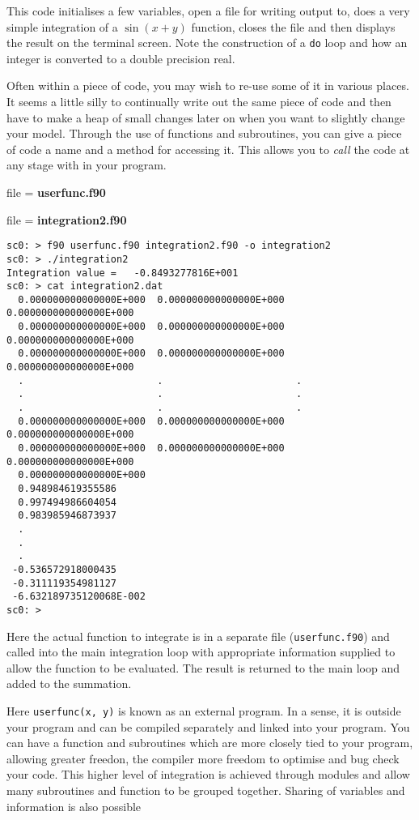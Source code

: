 \documentclass[12pt,a4paper,oneside,openany]{report}
\newcommand{\fcode}[1]{\par file = \textbf{#1} }
\newcommand{\code}[1]{\texttt{#1}}
\begin{document}
This code initialises a few variables, open a file for writing output to, does a very simple integration of a $\sin(x+y)$ function, closes the file and then displays the result on the terminal screen.  Note the construction of a \code{do} loop and how an integer is converted to a double precision real.

Often within a piece of code, you may wish to re-use some of it in various places.  It seems a little silly to continually write out the same piece of code and then have to make a heap of small changes later on when you want to slightly change your model.  Through the use of functions and subroutines, you can give a piece of code a name and a method for accessing it.  This allows you to \textit{call} the code at any stage with in your program.
\fcode{userfunc.f90}

\newpage

\fcode{integration2.f90}

\newpage

\begin{verbatim}
sc0: > f90 userfunc.f90 integration2.f90 -o integration2
sc0: > ./integration2
Integration value =   -0.8493277816E+001
sc0: > cat integration2.dat
  0.000000000000000E+000  0.000000000000000E+000  0.000000000000000E+000
  0.000000000000000E+000  0.000000000000000E+000  0.000000000000000E+000
  0.000000000000000E+000  0.000000000000000E+000  0.000000000000000E+000
  .                       .                       .
  .                       .                       .
  .                       .                       .
  0.000000000000000E+000  0.000000000000000E+000  0.000000000000000E+000
  0.000000000000000E+000  0.000000000000000E+000  0.000000000000000E+000
  0.000000000000000E+000
  0.948984619355586     
  0.997494986604054     
  0.983985946873937     
  .
  .
  .
 -0.536572918000435     
 -0.311119354981127     
 -6.632189735120068E-002
sc0: > 
\end{verbatim}

Here the actual function to integrate is in a separate file (\code{userfunc.f90}) and called into the main integration loop with appropriate information supplied to allow the function to be evaluated.  The result is returned to the main loop and added to the summation.

Here \code{userfunc(x, y)} is known as an external program.  In a sense, it is outside your program and can be compiled separately and linked into your program.  You can have a function and subroutines which are more closely tied to your program, allowing greater freedon, the compiler more freedom to optimise and bug check your code.  This higher level of integration is achieved through modules and allow many subroutines and function to be grouped together.  Sharing of variables and information is also possible
\end{document}
